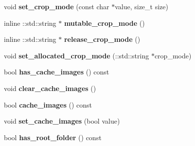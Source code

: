\begin{DoxyCompactItemize}
\mbox{\label{classcaffe_1_1_window_data_parameter_a4d0c86444a05c690a89dec36b50b6480}} 
void {\bfseries set\+\_\+crop\+\_\+mode} (const char $\ast$value, size\+\_\+t size)
\item 
\mbox{\label{classcaffe_1_1_window_data_parameter_a5d3bd011964c734a3e4bd82db79c3f76}} 
inline \+::std\+::string $\ast$ {\bfseries mutable\+\_\+crop\+\_\+mode} ()
\item 
\mbox{\label{classcaffe_1_1_window_data_parameter_abacb201a689a12fb8701fa23f559bd29}} 
inline \+::std\+::string $\ast$ {\bfseries release\+\_\+crop\+\_\+mode} ()
\item 
\mbox{\label{classcaffe_1_1_window_data_parameter_a87f94d658a73ed74f28db543d8f2a49c}} 
void {\bfseries set\+\_\+allocated\+\_\+crop\+\_\+mode} (\+::std\+::string $\ast$crop\+\_\+mode)
\item 
\mbox{\label{classcaffe_1_1_window_data_parameter_a2957d4c06e9ec1e36c98a74a9d45a821}} 
bool {\bfseries has\+\_\+cache\+\_\+images} () const
\item 
\mbox{\label{classcaffe_1_1_window_data_parameter_a7ff5970acdcf0f5eed4f98758d24f3ad}} 
void {\bfseries clear\+\_\+cache\+\_\+images} ()
\item 
\mbox{\label{classcaffe_1_1_window_data_parameter_a6168e1c24ea816e991b8c38e453e0157}} 
bool {\bfseries cache\+\_\+images} () const
\item 
\mbox{\label{classcaffe_1_1_window_data_parameter_a314385799ecb70e455bcb7234a999d24}} 
void {\bfseries set\+\_\+cache\+\_\+images} (bool value)
\item 
\mbox{\label{classcaffe_1_1_window_data_parameter_a56d814a28fdf63cc55809d6f7e8b0eac}} 
bool {\bfseries has\+\_\+root\+\_\+folder} () const
\item 
\mbox{\label{classcaffe_1_1_window_data_parameter_a9090274258ddc431fc1f9f51b478849a}} 

\end{DoxyCompactItemize}
